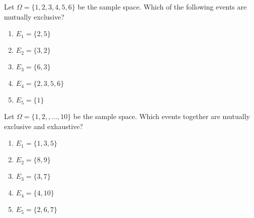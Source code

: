 \documentclass[../main.tex]{subfiles}
\begin{document}
%

\begin{example}
  Let \(\Omega = \{1,2,3,4,5,6\}\) be the sample space. Which of the following events are mutually exclusive?

  \begin{multicols}{2}
    \begin{enumerate}[label=(\alph*)]
      \item \(E_{1} = \{2,5\}\)
      \item \(E_{2} = \{3,2\}\)
      \item \(E_{3} = \{6,3\}\)
      \item \(E_{4} = \{2,3,5,6\}\)
      \item \(E_{5} = \{1\}\)
    \end{enumerate}
  \end{multicols}
\end{example}


\begin{example}
  Let \(\Omega = \{1,2,,\ldots,10\}\) be the sample space. Which events together are mutually exclusive and exhaustive?

  \begin{multicols}{2}
    \begin{enumerate}[label=(\alph*)]
      \item \(E_{1} = \{1,3,5\}\)
      \item \(E_{2} = \{8,9\}\)
      \item \(E_{3} = \{3,7\}\)
      \item \(E_{4} = \{4,10\}\)
      \item \(E_{5} = \{2,6,7\}\)
    \end{enumerate}
  \end{multicols}
\end{example}
\clearpage
\end{document}
